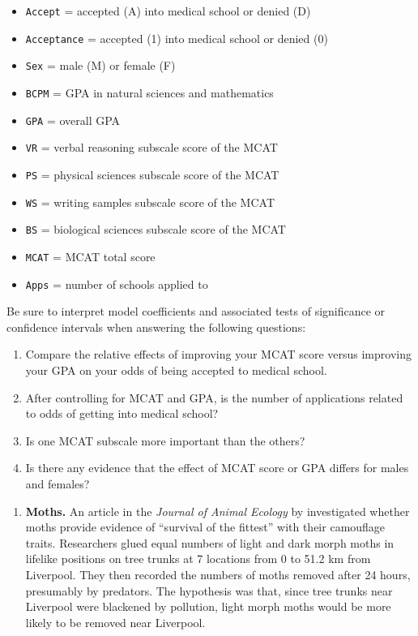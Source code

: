 \documentclass[
]{krantz}
\providecommand{\tightlist}{%
  \setlength{\itemsep}{0pt}\setlength{\parskip}{0pt}}
\begin{document}
\begin{itemize}
\tightlist
\item
  \texttt{Accept} = accepted (A) into medical school or denied (D)
\item
  \texttt{Acceptance} = accepted (1) into medical school or denied (0)
\item
  \texttt{Sex} = male (M) or female (F)
\item
  \texttt{BCPM} = GPA in natural sciences and mathematics
\item
  \texttt{GPA} = overall GPA
\item
  \texttt{VR} = verbal reasoning subscale score of the MCAT
\item
  \texttt{PS} = physical sciences subscale score of the MCAT
\item
  \texttt{WS} = writing samples subscale score of the MCAT
\item
  \texttt{BS} = biological sciences subscale score of the MCAT
\item
  \texttt{MCAT} = MCAT total score
\item
  \texttt{Apps} = number of schools applied to
\end{itemize}

Be sure to interpret model coefficients and associated tests of significance or confidence intervals when answering the following questions:

\begin{enumerate}
\def\labelenumi{\alph{enumi}.}
\tightlist
\item
  Compare the relative effects of improving your MCAT score versus improving your GPA on your odds of being accepted to medical school.\\
\item
  After controlling for MCAT and GPA, is the number of applications related to odds of getting into medical school?
\item
  Is one MCAT subscale more important than the others?
\item
  Is there any evidence that the effect of MCAT score or GPA differs for males and females?
\end{enumerate}

\begin{enumerate}
\def\labelenumi{\arabic{enumi}.}
\setcounter{enumi}{2}
\tightlist
\item
  \textbf{Moths.} An article in the \emph{Journal of Animal Ecology} by \citet{Bishop1972} investigated whether moths provide evidence of ``survival of the fittest'' with their camouflage traits. Researchers glued equal numbers of light and dark morph moths in lifelike positions on tree trunks at 7 locations from 0 to 51.2 km from Liverpool. They then recorded the numbers of moths removed after 24 hours, presumably by predators. The hypothesis was that, since tree trunks near Liverpool were blackened by pollution, light morph moths would be more likely to be removed near Liverpool.
\end{enumerate}
\end{document}
